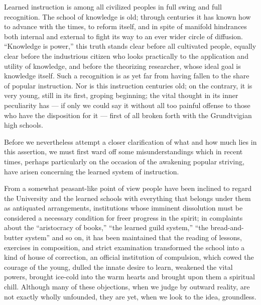 \documentclass[12pt,a4paper,openany]{book}
\newcommand{\opage}[1]{\marginnote{\footnotesize\textit{[#1]}}}
\begin{document}
Learned instruction is among all civilized peoples
in full swing and full recognition. The school of knowledge
is old; through centuries it has known how to
advance with the times, to reform itself, and in spite of
manifold hindrances both internal and external to fight its way
to an ever wider circle of diffusion. ``Knowledge
is power,'' this truth stands clear before all
cultivated people, equally clear before the industrious citizen
who looks practically to the application and
utility of knowledge, and before the theorizing researcher, whose ideal
goal is knowledge itself. Such a recognition
is as yet far from having fallen to the share of popular instruction.
Nor is this instruction centuries
old; on the contrary, it is very young, still in its first,
groping beginning; the vital thought in its inner peculiarity
has --- if only we could say it without
all too painful offense to those who have the disposition for it
--- first of all broken forth with the Grundtvigian
high schools.

Before we nevertheless attempt a closer clarification of
what and how much lies in this assertion, we must
first ward off some misunderstandings which in recent
\setcounter{footnote}{0}%
\opage{299}times, perhaps particularly on the occasion of the awakening popular
striving, have arisen concerning the learned system of instruction.

From a somewhat peasant-like point of view people have been
inclined to regard the University and the learned schools
with everything that belongs under them as antiquated arrangements,
institutions whose imminent dissolution must
be considered a necessary condition for freer progress in
the spirit; in complaints about the ``aristocracy of books,'' ``the
learned guild system,'' ``the bread-and-butter system'' and so on, it has been
maintained that the reading of lessons, exercises in composition, and strict examination
transformed the school into a kind of house of correction, an official
institution of compulsion, which cowed the courage of the young, dulled the
innate desire to learn, weakened the vital powers, brought ice-cold
into the warm hearts and brought upon them a spiritual
chill. Although many of these objections,
when we judge by outward reality, are not exactly
wholly unfounded, they are yet, when we look to
the idea, groundless.
\end{document}
